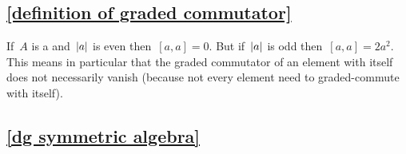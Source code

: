 \subsection{\cref{definition of graded commutator}}
\label{definition of graded commutator remark}

If~$A$ is a {\dga} and~$\lvert a\rvert$ is even then~$[a,a] = 0$.
But if~$\lvert a\rvert$ is odd then~$[a,a] = 2 a^2$.
This means in particular that the graded commutator of an element with itself does not necessarily vanish (because not every element need to graded-commute with itself).





\subsection{\cref{dg symmetric algebra}}
\label{dg symmetric algebra proof}

